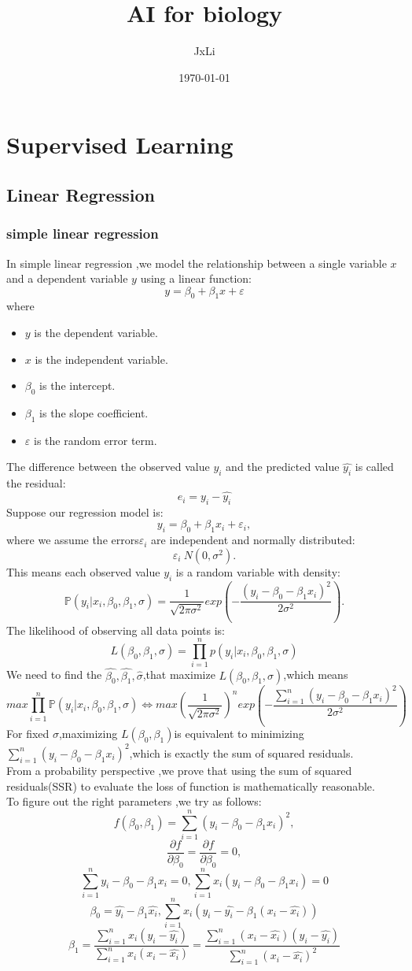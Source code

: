 \documentclass[a4paper, 12pt]{article}
\title{AI for biology}
\author{JxLi}
\date{\today}
\newcommand{\Pp}{\mathbb{P}}    %
\begin{document}
\maketitle
\section{Supervised Learning}
\subsection{Linear Regression}
\subsubsection{simple linear regression}
In simple linear regression ,we model the relationship between a single variable $x$ and a dependent variable $y$ using a linear function:
$$y = \beta_0+\beta_1 x+ \varepsilon$$
where 
\begin{itemize}
	\item $y$ is the dependent variable.
	\item $x$ is the independent variable.
	\item $\beta_0$ is the intercept.
	\item $\beta_1$ is the slope coefficient.
	\item $\varepsilon$ is the random error term.
\end{itemize}
The difference between the observed value $y_i$ and the predicted value $\hat{y_i}$ is called the residual:
$$e_i=y_i-\hat{y_i}$$
Suppose our regression model is:
$$y_i=\beta_0+\beta_1 x_i +\varepsilon_i,$$
where we assume the errors$\varepsilon_i$ are independent and normally distributed:
$$\varepsilon_i ~ N(0,\sigma^2).$$
This means each observed value $y_i$ is a random variable with density:
$$\Pp(y_i|x_i,\beta_0,\beta_1,\sigma)=\frac{1}{\sqrt{2\pi \sigma^2}}exp(-\frac{(y_i-\beta_0-\beta_1x_i)^2}{2\sigma^2}).$$
The likelihood of observing all data points is:
$$L(\beta_0,\beta_1,\sigma)=\prod_{i=1}^{n}p(y_i|x_i,\beta_0,\beta_1,\sigma)$$
We need to find the $\hat{\beta_0},\hat{\beta_1},\hat{\sigma}$,that maximize $L(\beta_0,\beta_1,\sigma)$,which means
$$max \prod_{i=1}^{n}\Pp(y_i|x_i,\beta_0,\beta_1,\sigma)\Leftrightarrow max (\frac{1}{\sqrt{2\pi \sigma^2}})^n exp(-\frac{\sum_{i=1}^{n}(y_i-\beta_0-\beta_1 x_i)^2}{2\sigma^2})$$
For fixed $\sigma$,maximizing $L(\beta_0,\beta_1)$is equivalent to minimizing $\sum_{i=1}^{n}(y_i-\beta_0-\beta_1x_i)^2$,which is exactly the sum of squared residuals.\\
From a probability perspective ,we prove that using the sum of squared residuals(SSR) to evaluate the loss of function is mathematically reasonable.\\
To figure out the right parameters ,we try as follows:
$$f(\beta_0,\beta_1)=\sum_{i=1}^{n}(y_i-\beta_0-\beta_1x_i)^2,$$ 
$$\frac{\partial{f}}{\partial \beta_0}=\frac{\partial{f}}{\partial \beta_0}=0,$$
$$\sum_{i=1}^{n}y_i-\beta_0 -\beta_1 x_i=0,\sum_{i=1}^{n}x_i(y_i-\beta_0-\beta_1x_i)=0$$
$$\beta_0=\hat{y_i}-\beta_1\hat{x_i},\sum_{i=1}^{n}x_i(y_i-\hat{y_i}-\beta_1(x_i-\hat{x_i}))$$
$$\beta_1=\frac{\sum_{i=1}^n x_i(y_i-\hat{y_i})}{\sum_{i=1}^n x_i(x_i-\hat{x_i})}=\frac{\sum_{i=1}^n (x_i-\hat{x_i})(y_i-\hat{y_i})}{\sum_{i=1}^n (x_i-\hat{x_i})^2}$$
\end{document}
